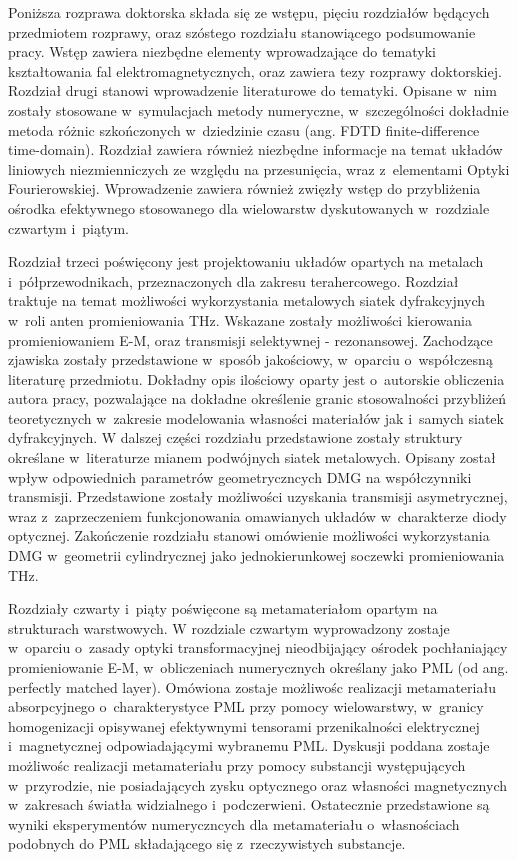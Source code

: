 Poniższa rozprawa doktorska składa się ze wstępu, pięciu rozdziałów  będących przedmiotem rozprawy, oraz szóstego rozdziału stanowiącego podsumowanie pracy. Wstęp zawiera niezbędne elementy wprowadzające do tematyki kształtowania fal elektromagnetycznych, oraz zawiera tezy rozprawy doktorskiej. Rozdział drugi stanowi wprowadzenie literaturowe do tematyki. Opisane w~nim zostały stosowane w~symulacjach metody numeryczne, w~szczególności dokładnie metoda różnic szkończonych w~dziedzinie czasu (ang. FDTD finite-difference time-domain). Rozdział zawiera również niezbędne informacje na temat układów liniowych niezmienniczych ze względu na przesunięcia, wraz z~elementami Optyki Fourierowskiej. Wprowadzenie zawiera również zwięzły wstęp do przybliżenia ośrodka efektywnego stosowanego dla wielowarstw dyskutowanych w~rozdziale czwartym i~piątym.

Rozdział trzeci poświęcony jest projektowaniu układów opartych na metalach i~półprzewodnikach, przeznaczonych dla zakresu terahercowego. Rozdział traktuje na temat możliwości wykorzystania metalowych siatek dyfrakcyjnych w~roli anten promieniowania THz. Wskazane zostały możliwości kierowania promieniowaniem E-M, oraz transmisji  selektywnej - rezonansowej. Zachodzące zjawiska zostały przedstawione w~sposób jakościowy, w~oparciu o~współczesną literaturę przedmiotu. Dokładny opis ilościowy oparty jest o~autorskie obliczenia autora pracy, pozwalające na dokładne określenie granic stosowalności przybliżeń teoretycznych w~zakresie modelowania własności materiałów jak i~samych siatek dyfrakcyjnych. W dalszej części rozdziału przedstawione zostały struktury określane w~literaturze mianem podwójnych siatek metalowych. Opisany został wpływ odpowiednich parametrów geometryczncych DMG na współczynniki transmisji. Przedstawione zostały możliwości uzyskania transmisji asymetrycznej, wraz z~zaprzeczeniem funkcjonowania omawianych układów w~charakterze diody optycznej. Zakończenie rozdziału stanowi omówienie możliwości wykorzystania DMG w~geometrii cylindrycznej jako jednokierunkowej soczewki promieniowania THz.

Rozdziały czwarty i~piąty poświęcone są metamateriałom opartym na strukturach warstwowych. W rozdziale czwartym wyprowadzony zostaje w~oparciu o~zasady optyki transformacyjnej nieodbijający ośrodek pochłaniający promieniowanie E-M, w~obliczeniach numerycznych określany jako PML (od ang. perfectly matched layer). Omówiona zostaje możliwośc realizacji metamateriału absorpcyjnego o~charakterystyce PML przy pomocy wielowarstwy, w~granicy homogenizacji opisywanej efektywnymi tensorami przenikalności elektrycznej i~magnetycznej odpowiadającymi wybranemu PML. Dyskusji poddana zostaje możliwośc realizacji metamateriału przy pomocy substancji występujących w~przyrodzie, nie posiadających zysku optycznego oraz własności magnetycznych w~zakresach światła widzialnego i~podczerwieni. Ostatecznie przedstawione są wyniki eksperymentów numeryczncych dla metamateriału o~własnościach podobnych do PML składającego się z~rzeczywistych substancje.

